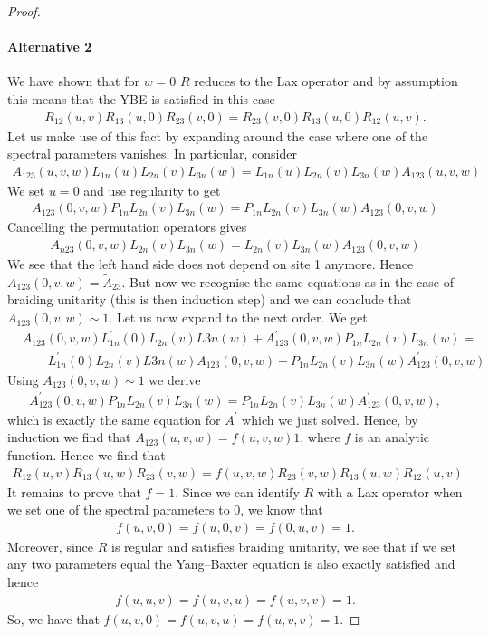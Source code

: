\documentclass{article}
\begin{document}
\begin{proof}
\paragraph{Alternative 2}
We have shown that for $w=0$ $R$ reduces to the Lax operator and by assumption this means that the YBE is satisfied in this case
%
\begin{align}
R_{12}(u,v) R_{13}(u,0) R_{23}(v,0) = R_{23}(v,0) R_{13} (u,0)R_{12}(u,v).
\end{align}
%
Let us make use of this fact by expanding around the case where one of the spectral parameters vanishes. In particular, consider
%
\begin{align}
A_{123}(u,v,w)L_{1n}(u)L_{2n}(v)L_{3n}(w)=L_{1n}(u)L_{2n}(v)L_{3n}(w)A_{123}(u,v,w)
\end{align}
%
We set $u=0$ and use regularity to get
%
\begin{align}
A_{123}(0,v,w)P_{1n}L_{2n}(v)L_{3n}(w)=P_{1n}L_{2n}(v)L_{3n}(w)A_{123}(0,v,w)
\end{align}
%
Cancelling the permutation operators gives
%
\begin{align}
A_{n23}(0,v,w)L_{2n}(v)L_{3n}(w)=L_{2n}(v)L_{3n}(w)A_{123}(0,v,w)
\end{align}
%
We see that the left hand side does not depend on site 1 anymore. Hence $A_{123}(0,v,w) = \tilde{A}_{23}$. But now we recognise the same equations as in the case of braiding unitarity (this is then induction step) and we can conclude that $A_{123}(0,v,w) \sim 1$. Let us now expand to the next order. We get
%
\begin{align}
&A_{123}(0,v,w)L^\prime_{1n}(0)L_{2n}(v)L{3n}(w) + A^\prime_{123}(0,v,w)P_{1n}L_{2n}(v)L_{3n}(w) = \\
&\qquad L^\prime_{1n}(0)L_{2n}(v)L{3n}(w)A_{123}(0,v,w) + P_{1n}L_{2n}(v)L_{3n}(w)A^\prime_{123}(0,v,w)
\end{align}
%
Using  $A_{123}(0,v,w) \sim 1$ we derive
%
\begin{align}
 A^\prime_{123}(0,v,w) P_{1n}L_{2n}(v)L_{3n}(w) =  P_{1n}L_{2n}(v)L_{3n}(w)A^\prime_{123}(0,v,w),
\end{align}
%
which is exactly the same equation for $A^\prime$ which we just solved. Hence, by induction we find that  $A_{123}(u,v,w) = f(u,v,w) 1 $, where $f$ is an analytic function. Hence we find that 
%
\begin{align}
R_{12}(u,v) R_{13}(u,w) R_{23}(v,w) = f(u,v,w) R_{23}(v,w) R_{13} (u,w)R_{12}(u,v)
\end{align}
%
It remains to prove that $f=1$. Since we can identify $R$ with a Lax operator when we set one of the spectral parameters to 0, we know that
%
\begin{align}
f(u,v,0) =f(u,0,v) =f(0,u,v) =1.
\end{align}
%
Moreover, since $R$ is regular and satisfies braiding unitarity, we see that if we set any two parameters equal the Yang--Baxter equation is also exactly satisfied and hence
%
\begin{align}
f(u,u,v) = f(u,v, u) = f(u, v,v) = 1.
\end{align}
%
So, we have that $f(u,v,0) = f(u,v,u) = f(u,v,v) = 1$.
\fi
\end{proof}
\end{document}
